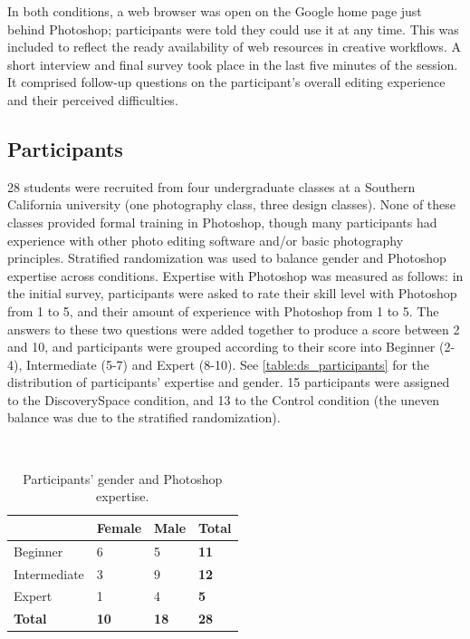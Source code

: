 In both conditions, a web browser was open on the Google home page just behind Photoshop; participants were told they could use it at any time. This was included to reflect the ready availability of web resources in creative workflows. A short interview and final survey took place in the last five minutes of the session. It comprised follow-up questions on the participant's overall editing experience and their perceived difficulties. 

\subsection{Participants}
28 students were recruited from four undergraduate classes at a Southern California university (one photography class, three design classes). None of these classes provided formal training in Photoshop, though many participants had experience with other photo editing software and/or basic photography principles. Stratified randomization was used to balance gender and Photoshop expertise across conditions. Expertise with Photoshop was measured as follows: in the initial survey, participants were asked to rate their skill level with Photoshop from 1 to 5, and their amount of experience with Photoshop from 1 to 5. The answers to these two questions were added together to produce a score between 2 and 10, and participants were grouped according to their score into Beginner (2-4), Intermediate (5-7) and Expert (8-10). See \autoref{table:ds_participants} for the distribution of participants' expertise and gender. 15 participants were assigned to the Discovery\-Space condition, and 13 to the Control condition (the uneven balance was due to the stratified randomization).

\begin{table}[t]
\centering
\caption{Participants' gender and Photoshop expertise.}~\label{table:ds_participants}
\begin{tabular}{l|lll}
 & Female & Male & \textbf{Total} \\ \hline
Beginner & 6 & 5 & \textbf{11} \\
Intermediate & 3 & 9 & \textbf{12} \\
Expert & 1 & 4 & \textbf{5} \\
\textbf{Total} & \textbf{10} & \textbf{18} & \textbf{28}
\end{tabular}
\end{table}

